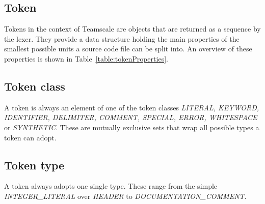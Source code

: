 \subsection{Token}
\label{section:token}
Tokens in the context of Teamscale are objects that are returned as a sequence by the lexer. They provide a data structure holding the main properties of the smallest possible units a source code file can be split into. An overview of these properties is shown in Table~\ref{table:tokenProperties}.


\subsection{Token class}
A token is always an element of one of the token classes \textit{LITERAL, KEYWORD, IDENTIFIER, DELIMITER, COMMENT, SPECIAL, ERROR, WHITESPACE} or \textit{SYNTHETIC}. These are mutually exclusive sets that wrap all possible types a token can adopt.

\subsection{Token type}
A token always adopts one single type. These range from the simple \textit{INTEGER\_LITERAL} over \textit{HEADER} to \textit{DOCUMENTATION\_COMMENT}.
